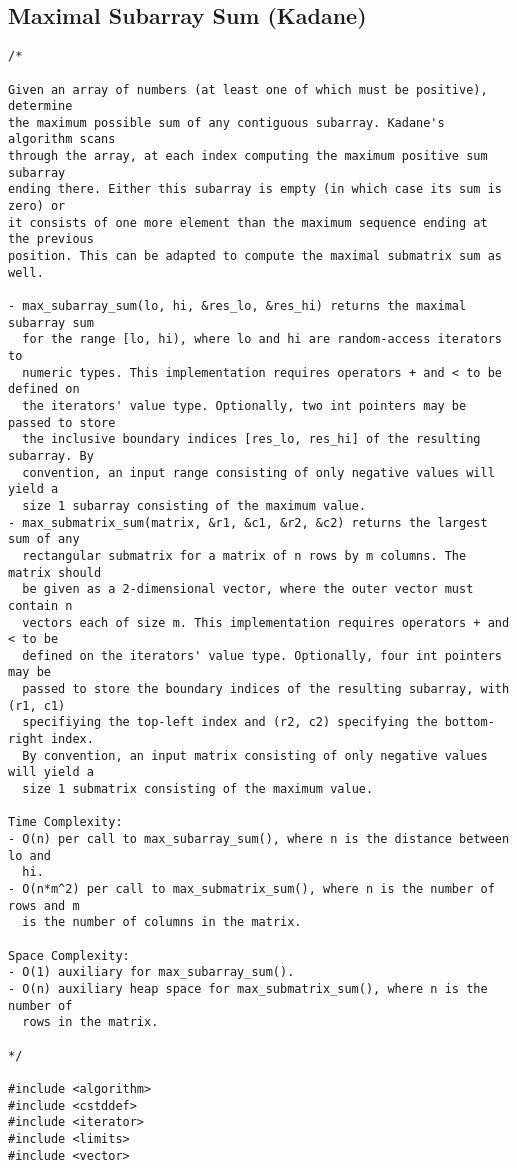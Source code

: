 \subsection{Maximal Subarray Sum (Kadane)}
\begin{lstlisting}
/*

Given an array of numbers (at least one of which must be positive), determine
the maximum possible sum of any contiguous subarray. Kadane's algorithm scans
through the array, at each index computing the maximum positive sum subarray
ending there. Either this subarray is empty (in which case its sum is zero) or
it consists of one more element than the maximum sequence ending at the previous
position. This can be adapted to compute the maximal submatrix sum as well.

- max_subarray_sum(lo, hi, &res_lo, &res_hi) returns the maximal subarray sum
  for the range [lo, hi), where lo and hi are random-access iterators to
  numeric types. This implementation requires operators + and < to be defined on
  the iterators' value type. Optionally, two int pointers may be passed to store
  the inclusive boundary indices [res_lo, res_hi] of the resulting subarray. By
  convention, an input range consisting of only negative values will yield a
  size 1 subarray consisting of the maximum value.
- max_submatrix_sum(matrix, &r1, &c1, &r2, &c2) returns the largest sum of any
  rectangular submatrix for a matrix of n rows by m columns. The matrix should
  be given as a 2-dimensional vector, where the outer vector must contain n
  vectors each of size m. This implementation requires operators + and < to be
  defined on the iterators' value type. Optionally, four int pointers may be
  passed to store the boundary indices of the resulting subarray, with (r1, c1)
  specifiying the top-left index and (r2, c2) specifying the bottom-right index.
  By convention, an input matrix consisting of only negative values will yield a
  size 1 submatrix consisting of the maximum value.

Time Complexity:
- O(n) per call to max_subarray_sum(), where n is the distance between lo and
  hi.
- O(n*m^2) per call to max_submatrix_sum(), where n is the number of rows and m
  is the number of columns in the matrix.

Space Complexity:
- O(1) auxiliary for max_subarray_sum().
- O(n) auxiliary heap space for max_submatrix_sum(), where n is the number of
  rows in the matrix.

*/

#include <algorithm>
#include <cstddef>
#include <iterator>
#include <limits>
#include <vector>


\end{lstlisting}
